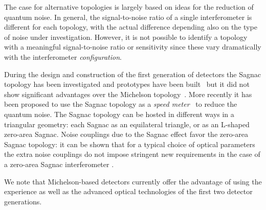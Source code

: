 The case for alternative topologies is largely based on ideas for the
reduction of quantum noise. In general, the signal-to-noise ratio of a
single interferometer is different for each topology, with the actual
difference depending also on the type of noise under investigation.
However, it is not possible to identify a topology with a meaningful
signal-to-noise ratio or sensitivity since these vary dramatically
with the interferometer \emph{configuration}.

During the design and construction of the first generation of detectors
the Sagnac topology has been investigated and prototypes have been
built~\cite{Sun1996} but it did not show significant advantages over the Michelson
topology~\cite{Mizuno97}. More recently it has been proposed to use the Sagnac topology
as a \emph{speed meter}~\cite{Chen2003} to reduce the quantum noise.
The Sagnac topology can be hosted in different ways in a triangular
geometry: each Sagnac as an equilateral triangle, or as an {\sf L}-shaped
zero-area Sagnac. Noise couplings due to the Sagnac effect favor the
zero-area Sagnac topology: it can be shown that for a typical
choice of optical parameters the extra noise couplings do not
impose stringent new requirements in the case of a zero-area Sagnac
interferometer \cite{Freise2009}.

We note that Michelson-based detectors currently offer the
advantage of using the experience as well as the
advanced optical technologies of the first two detector generations.




